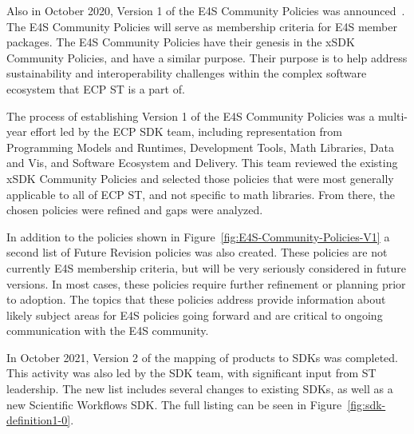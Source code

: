 Also in October 2020, Version 1 of the E4S Community Policies was announced~\cite{e4s:policies}. The E4S Community Policies will serve as membership criteria for E4S member packages. The E4S Community Policies have their genesis in the xSDK Community Policies, and have a similar purpose. Their purpose is to help address sustainability and interoperability challenges within the complex software ecosystem that ECP ST is a part of.

The process of establishing Version 1 of the E4S Community Policies was a multi-year effort led by the ECP SDK team, including representation from Programming Models and Runtimes, Development Tools, Math Libraries, Data and Vis, and Software Ecosystem and Delivery. This team reviewed the existing xSDK Community Policies and selected those policies that were most generally applicable to all of ECP ST, and not specific to math libraries. From there, the chosen policies were refined and gaps were analyzed.

In addition to the policies shown in Figure~\ref{fig:E4S-Community-Policies-V1} a second list of Future Revision policies was also created. These policies are not currently E4S membership criteria, but will be very seriously considered in future versions. In most cases, these policies require further refinement or planning prior to adoption. The topics that these policies address provide information about likely subject areas for E4S policies going forward and are critical to ongoing communication with the E4S community.

In October 2021, Version 2 of the mapping of products to SDKs was completed. This activity was also led by the SDK team, with significant input from ST leadership. The new list includes several changes to existing SDKs, as well as a new Scientific Workflows SDK. The full listing can be seen in Figure~\ref{fig:sdk-definition1-0}.


